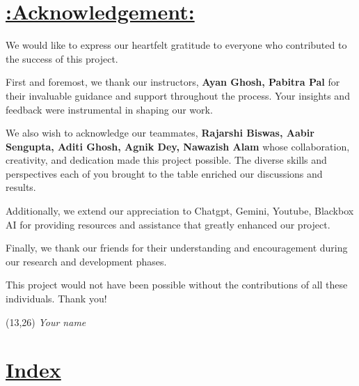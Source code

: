 \documentclass[a4paper,12pt]{article}
\begin{document}
\section*{\underline{\Huge\textbf{\textcolor{blue!60}{:Acknowledgement:}}}}
\vspace{1 cm}
\begin{flushleft}
\par
\Large{We would like to express our heartfelt gratitude to everyone who contributed to the success of this project. 

First and foremost, we thank our instructors, \textbf{Ayan Ghosh, Pabitra Pal} for their invaluable guidance and support throughout the process. Your insights and feedback were instrumental in shaping our work.

We also wish to acknowledge our teammates, \textbf{Rajarshi Biswas, Aabir Sengupta, Aditi Ghosh, Agnik Dey, Nawazish Alam} whose collaboration, creativity, and dedication made this project possible. The diverse skills and perspectives each of you brought to the table enriched our discussions and results.

Additionally, we extend our appreciation to Chatgpt, Gemini, Youtube, Blackbox AI for providing resources and assistance that greatly enhanced our project.

Finally, we thank our friends for their understanding and encouragement during our research and development phases.

This project would not have been possible without the contributions of all these individuals. Thank you!}
\end{flushleft}
\setlength{\TPHorizModule}{1cm}
\setlength{\TPVertModule}{1cm}
\begin{textblock}{5}(13,26)
    \raggedleft
    \textit{Your name}
\end{textblock}


\newpage
{}
\vspace{-2cm}

\centering
\section*{\underline{\Huge\textbf{\textcolor{blue!60}{Index}}}}
\vspace{0.5cm}
\end{document}
